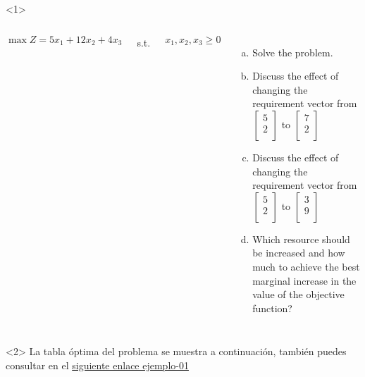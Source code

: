\begin{frameExample}{}{}
  \begin{onlyenv}<1>
      \begin{columns}
      $\max Z = 5x_1 + 12x_2 + 4x_3$

      \vspace{5mm}

      s.t.

  \vspace{5mm}
  
  $x_1 , x_2, x_3 \geq 0$ 
  \begin{enumerate}[a)] \justifying \parskip4mm
  \item Solve the problem.
  \item Discuss the effect of changing the requirement vector from $%
    \begin{bmatrix}
      5\\
      2\\
    \end{bmatrix}
    $%
    to%
    $
    \begin{bmatrix}
      7\\
      2\\
    \end{bmatrix}
$
\item Discuss the effect of changing the requirement vector from %
  $
  \begin{bmatrix}
    5\\2\\
  \end{bmatrix}
  $
  to%
  $
  \begin{bmatrix}
    3\\9\\
  \end{bmatrix}
  $
  \item Which resource should be increased and how much to achieve the best marginal increase in the value of the objective function?
  \end{enumerate}
  \end{columns}
\end{onlyenv}
\begin{onlyenv}<2>
  La tabla óptima del problema se muestra a continuación, también puedes consultar en el \href{https://docs.google.com/spreadsheets/d/1c_EYB4K6b5I41TF0n74JOaoJKIATqnliQdcul8ult_E/edit?usp=sharing}{siguiente enlace ejemplo-01}


\end{onlyenv}
\end{frameExample}
